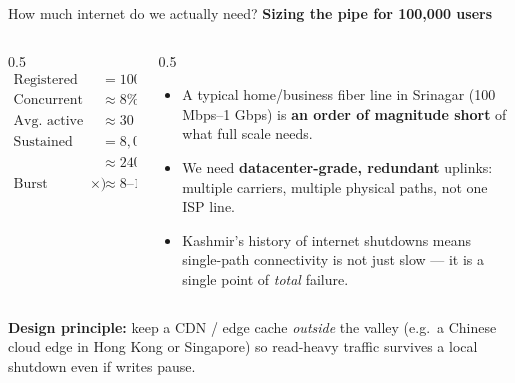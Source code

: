 \documentclass[aspectratio=169,10pt]{beamer}
\newcommand{\eyebrow}[1]{{\small\color{sovGold}\textbf{#1}}}
\begin{document}
\begin{frame}{How much internet do we actually need?}
  \eyebrow{Sizing the pipe for 100{,}000 users}
  \begin{columns}[T]
    \begin{column}{0.5\textwidth}
      \small
      \begin{align*}
        \text{Registered users} &= 100{,}000\\
        \text{Concurrent (peak)} &\approx 8\% = 8{,}000\\
        \text{Avg. active payload} &\approx 30~\text{KB/s/user}\\
        \text{Sustained peak} &= 8{,}000 \times 30\text{KB/s}\\
                               &\approx 240~\text{MB/s} \approx 2~\text{Gbps}\\
        \text{Burst headroom (4}\times) &\approx 8\text{--}10~\text{Gbps}
      \end{align*}
    \end{column}
    \begin{column}{0.5\textwidth}
      \begin{itemize}
        \item A typical home/business fiber line in Srinagar (100 Mbps--1 Gbps) is \textbf{an order of magnitude short} of what full scale needs.
        \item We need \textbf{datacenter-grade, redundant} uplinks: multiple carriers, multiple physical paths, not one ISP line.
        \item Kashmir's history of internet shutdowns means single-path connectivity is not just slow --- it is a single point of \emph{total} failure.
      \end{itemize}
    \end{column}
  \end{columns}
  \vspace{4pt}
  \begin{takeaway}
   \textbf{Design principle:} keep a CDN / edge cache \emph{outside} the valley (e.g.\ a Chinese cloud edge in Hong Kong or Singapore) so read-heavy traffic survives a local shutdown even if writes pause.
  \end{takeaway}
\end{frame}
\end{document}
